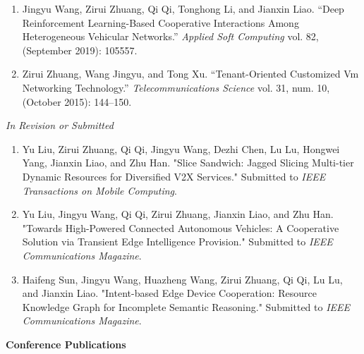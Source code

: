 \documentclass[letterpaper,11pt]{article}
\newcommand{\contentlength}{5.5in}
\begin{document}
\begin{tcolorbox}[flush right,breakable,colback=white,colframe=white,width=\contentlength]
\begin{enumerate}[itemsep=0mm]
			\item Jingyu Wang, Zirui Zhuang, Qi Qi, Tonghong Li, and Jianxin Liao. “Deep Reinforcement Learning-Based Cooperative Interactions Among Heterogeneous Vehicular Networks.” \textit{Applied Soft Computing} vol. 82, (September 2019): 105557.
			\item Zirui Zhuang, Wang Jingyu, and Tong Xu. “Tenant-Oriented Customized Vm Networking Technology.” \textit{Telecommunications Science} vol. 31, num. 10, (October 2015): 144–150.
		\end{enumerate}
		
		\textit{In Revision or Submitted}
		\begin{enumerate}[itemsep=0mm,resume]
			\item Yu Liu, Zirui Zhuang, Qi Qi, Jingyu Wang, Dezhi Chen, Lu Lu, Hongwei Yang, Jianxin Liao, and Zhu Han. "Slice Sandwich: Jagged Slicing Multi-tier Dynamic Resources for Diversified V2X Services." Submitted to \textit{IEEE Transactions on Mobile Computing}.
			\item Yu Liu, Jingyu Wang, Qi Qi, Zirui Zhuang, Jianxin Liao, and Zhu Han. "Towards High-Powered Connected Autonomous Vehicles: A Cooperative Solution via Transient Edge Intelligence Provision." Submitted to \textit{IEEE Communications Magazine}.
			\item Haifeng Sun, Jingyu Wang, Huazheng Wang, Zirui Zhuang, Qi Qi, Lu Lu, and Jianxin Liao. "Intent-based Edge Device Cooperation: Resource Knowledge Graph for Incomplete Semantic Reasoning." Submitted to \textit{IEEE Communications Magazine}.
		\end{enumerate}
		
		\textbf{Conference Publications}
		

\end{tcolorbox}
\end{document}
